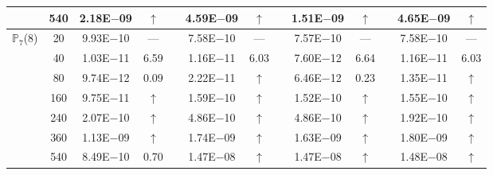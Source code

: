 \begin{table}[H]
{\begin{tabular}{@{}l c c c c c c c c c c c c@{}}
 & 540 & 2.18E$-$09 & $\uparrow$  &  & 4.59E$-$09 & $\uparrow$ &  & 1.51E$-$09 & $\uparrow$ &  & 4.65E$-$09 & $\uparrow$\\
\midrule
\multirow{7}{*}{$\mathbb{P}_{7}$(8)}
 & 20 & 9.93E$-$10 & ---  &  & 7.58E$-$10 & --- &  & 7.57E$-$10 & --- &  & 7.58E$-$10 & ---\\
 & 40 & 1.03E$-$11 & 6.59  &  & 1.16E$-$11 & 6.03 &  & 7.60E$-$12 & 6.64 &  & 1.16E$-$11 & 6.03\\
 & 80 & 9.74E$-$12 & 0.09  &  & 2.22E$-$11 & $\uparrow$ &  & 6.46E$-$12 & 0.23 &  & 1.35E$-$11 & $\uparrow$\\
 & 160 & 9.75E$-$11 & $\uparrow$  &  & 1.59E$-$10 & $\uparrow$ &  & 1.52E$-$10 & $\uparrow$ &  & 1.55E$-$10 & $\uparrow$\\
 & 240 & 2.07E$-$10 & $\uparrow$  &  & 4.86E$-$10 & $\uparrow$ &  & 4.86E$-$10 & $\uparrow$ &  & 1.92E$-$10 & $\uparrow$\\
 & 360 & 1.13E$-$09 & $\uparrow$  &  & 1.74E$-$09 & $\uparrow$ &  & 1.63E$-$09 & $\uparrow$ &  & 1.80E$-$09 & $\uparrow$\\
 & 540 & 8.49E$-$10 & 0.70  &  & 1.47E$-$08 & $\uparrow$ &  & 1.47E$-$08 & $\uparrow$ &  & 1.48E$-$08 & $\uparrow$\\
\bottomrule
\end{tabular}}
\label{PRO:bending:01_01_glob1v2}
\end{table}
